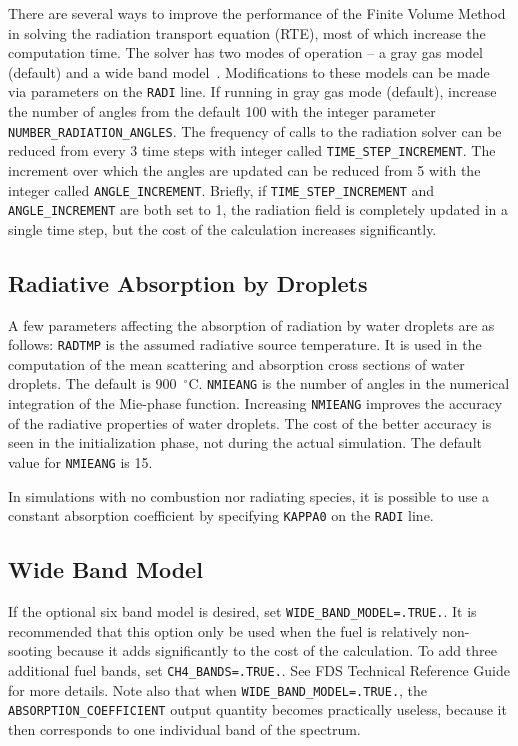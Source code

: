 \documentclass[11pt]{book}
\newcommand{\ct}{\tt\small}
\begin{document}
There are several ways to improve the performance of the Finite Volume
Method in solving the radiation transport equation (RTE), most of which
increase the computation time. The solver has two modes of
operation -- a gray gas model (default) and a wide band model~\cite{FDS_Math_Guide}.
Modifications to these models can be made via parameters on the
{\ct RADI} line. If running in gray gas mode (default), increase the number
of angles from the default 100 with the integer parameter
{\ct NUMBER\_RADIATION\_ANGLES}. The frequency of calls to the radiation
solver can be reduced from every 3 time steps with integer called
{\ct TIME\_STEP\_INCREMENT}. The increment over which the angles are
updated can be reduced from 5 with the integer called {\ct ANGLE\_INCREMENT}.
Briefly, if {\ct TIME\_STEP\_INCREMENT} and {\ct ANGLE\_INCREMENT} are
both set to 1, the radiation field is completely updated in a single
time step, but the cost of the calculation increases significantly.

\subsection{Radiative Absorption by Droplets}

\label{info:RADI_Absorption}

A few parameters affecting the absorption of radiation by water
droplets are as follows: {\ct RADTMP} is the assumed radiative source temperature.
It is used in the computation of the mean scattering
and absorption cross sections of water droplets. The default is 900~$^\circ$C.
{\ct NMIEANG} is the number of angles in the numerical integration of the Mie-phase function.
Increasing {\ct NMIEANG} improves the accuracy
of the radiative properties of water droplets. The cost
of the better accuracy is seen in the initialization phase,
not during the actual simulation. The default value for {\ct NMIEANG}
is 15.

In simulations with no combustion nor radiating species, it is
possible to use a constant absorption coefficient by specifying {\ct KAPPA0} on the {\ct RADI} line.

\subsection{Wide Band Model}

\label{info:RADI_Wide_Band}

If the optional six band model is desired,
set {\ct WIDE\_BAND\_MODEL=.TRUE.}. It is recommended that this option
only be used when the fuel is relatively non-sooting because it
adds significantly to the cost of the calculation. To add three
additional fuel bands, set {\ct CH4\_BANDS=.TRUE.}. See FDS Technical
Reference Guide for more details. Note also that when
{\ct WIDE\_BAND\_MODEL=.TRUE.}, the {\ct ABSORPTION\_COEFFICIENT}
output quantity becomes practically useless, because it then
corresponds to one individual band of the spectrum.
\end{document}
